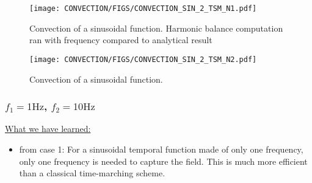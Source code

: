 \begin{figure}[htbp]
  \begin{center}
    \texttt{[image: CONVECTION/FIGS/CONVECTION\_SIN\_2\_TSM\_N1.pdf]}
  \end{center}
  \caption{Convection of a sinusoidal function. Harmonic balance computation
  ran with frequency compared to analytical result}
  \label{fig:convection_sin_2_tsm_n_1}
\end{figure}

\begin{figure}[htbp]
  \begin{center}
    \texttt{[image: CONVECTION/FIGS/CONVECTION\_SIN\_2\_TSM\_N2.pdf]}
  \end{center}
  \caption{Convection of a sinusoidal function.}
  \label{fig:convection_sin_2_tsm_n_2}
\end{figure}

\subsubsection{$f_1 = 1 \text{Hz}$, $f_2 = 10 \text{Hz}$}




\underline{What we have learned:} 
\begin{itemize}
  \item from case 1: For a sinusoidal temporal function made of only one frequency,
        only one frequency is needed to capture the field. This is much more efficient
        than a classical time-marching scheme.
\end{itemize}




